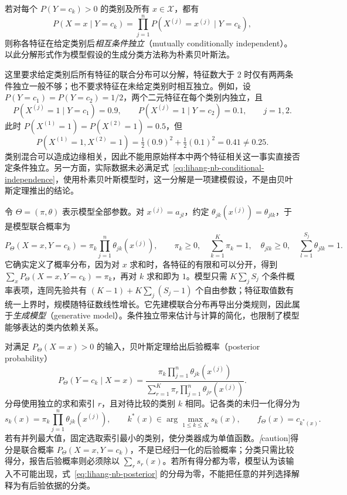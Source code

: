 \begin{definition}
\label{def:lihang-nb-conditional-independence}
若对每个 $P(Y=c_k)>0$ 的类别及所有 $x\in\mathcal{X}$，都有
\begin{equation}
\label{eq:lihang-nb-conditional-independence}
    P(X=x\mid Y=c_k)
    =\prod_{j=1}^{n}P(X^{(j)}=x^{(j)}\mid Y=c_k),
\end{equation}
则称各特征在给定类别后\emph{相互条件独立}（mutually conditionally independent）。以此分解形式作为模型假设的生成分类方法称为朴素贝叶斯法。
\end{definition}

这里要求给定类别后所有特征的联合分布可以分解，特征数大于 $2$ 时仅有两两条件独立一般不够；也不要求特征在未给定类别时相互独立。例如，设 $P(Y=c_1)=P(Y=c_2)=1/2$，两个二元特征在每个类别内独立，且
\[
    P(X^{(j)}=1\mid Y=c_1)=0.9,\qquad
    P(X^{(j)}=1\mid Y=c_2)=0.1,\qquad j=1,2.
\]
此时 $P(X^{(1)}=1)=P(X^{(2)}=1)=0.5$，但
\[
    P(X^{(1)}=1,X^{(2)}=1)
    =\tfrac12(0.9)^2+\tfrac12(0.1)^2=0.41\neq0.25.
\]
类别混合可以造成边缘相关，因此不能用原始样本中两个特征相关这一事实直接否定条件独立。另一方面，实际数据未必满足式~\eqref{eq:lihang-nb-conditional-independence}，使用朴素贝叶斯模型时，这一分解是一项建模假设，不是由贝叶斯定理推出的结论。

令 $\Theta=(\pi,\theta)$ 表示模型全部参数。对 $x^{(j)}=a_{jl}$，约定 $\theta_{jk}(x^{(j)})=\theta_{jlk}$，于是模型联合概率为
\begin{equation}
\label{eq:lihang-nb-joint-model}
    P_\Theta(X=x,Y=c_k)=\pi_k\prod_{j=1}^{n}\theta_{jk}(x^{(j)}),\qquad
    \pi_k\geq0,\quad\sum_{k=1}^{K}\pi_k=1,\quad
    \theta_{jlk}\geq0,\quad\sum_{l=1}^{S_j}\theta_{jlk}=1.
\end{equation}
它确实定义了概率分布，因为对 $x$ 求和时，各特征的有限和可以分开，得到 $\sum_x P_\Theta(X=x,Y=c_k)=\pi_k$，再对 $k$ 求和即为 $1$。模型只需 $K\sum_j S_j$ 个条件概率表项，连同先验共有 $(K-1)+K\sum_j(S_j-1)$ 个自由参数；特征取值数有统一上界时，规模随特征数线性增长。它先建模联合分布再导出分类规则，因此属于\emph{生成模型}（generative model）。条件独立带来估计与计算的简化，也限制了模型能够表达的类内依赖关系。

对满足 $P_\Theta(X=x)>0$ 的输入，贝叶斯定理给出后验概率（posterior probability）
\begin{equation}
\label{eq:lihang-nb-posterior}
    P_\Theta(Y=c_k\mid X=x)
    =\frac{\pi_k\prod_{j=1}^{n}\theta_{jk}(x^{(j)})}
    {\displaystyle\sum_{r=1}^{K}\pi_r\prod_{j=1}^{n}\theta_{jr}(x^{(j)})}.
\end{equation}
分母使用独立的求和索引 $r$，且对待比较的类别 $k$ 相同。记各类的未归一化得分为
\begin{equation}
\label{eq:lihang-nb-score-rule}
    s_k(x)=\pi_k\prod_{j=1}^{n}\theta_{jk}(x^{(j)}),\qquad
    k^*(x)\in\arg\max_{1\leq k\leq K}s_k(x),\qquad f_\Theta(x)=c_{k^*(x)}.
\end{equation}
若有并列最大值，固定选取索引最小的类别，使分类器成为单值函数。\emph[caution]{得分是联合概率 $P_\Theta(X=x,Y=c_k)$，不是已经归一化的后验概率}；分类只需比较得分，报告后验概率则必须除以 $\sum_r s_r(x)$。若所有得分都为零，模型认为该输入不可能出现，式~\eqref{eq:lihang-nb-posterior} 的分母为零，不能把任意的并列选择解释为有后验依据的分类。

